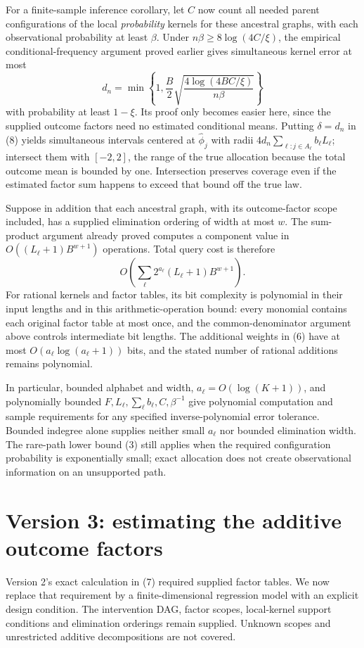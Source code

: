 \documentclass[11pt]{article}
\theoremstyle{definition}
\begin{document}
For a finite-sample inference corollary, let $C$ now count all needed
parent configurations of the local \emph{probability} kernels for these
ancestral graphs, with each observational probability at least $\beta$.
Under $n\beta\ge8\log(4C/\xi)$, the empirical conditional-frequency
argument proved earlier gives simultaneous kernel error at most
\[
 d_n=\min\left\{1,\frac B2
       \sqrt{\frac{4\log(4BC/\xi)}{n\beta}}\right\}
\]
with probability at least $1-\xi$. Its proof only becomes easier here,
since the supplied outcome factors need no estimated conditional means.
Putting $\delta=d_n$ in (8) yields simultaneous intervals centered at
$\widehat\phi_j$ with radii
$4d_n\sum_{\ell:j\in A_\ell}b_\ell L_\ell$; intersect them with
$[-2,2]$, the range of the true allocation because the total outcome
mean is bounded by one. Intersection preserves coverage even if the
estimated factor sum happens to exceed that bound off the true law.

Suppose in addition that each ancestral graph, with its outcome-factor
scope included, has a supplied elimination ordering of width at most
$w$. The sum-product argument already proved computes a component value
in $O((L_\ell+1)B^{w+1})$ operations. Total query cost is therefore
\[
 O\left(\sum_\ell2^{a_\ell}(L_\ell+1)B^{w+1}\right).
\]
For rational kernels and factor tables, its bit complexity is polynomial
in their input lengths and in this arithmetic-operation bound: every
monomial contains each original factor table at most once, and the
common-denominator argument above controls intermediate bit lengths.
The additional weights in (6) have at most $O(a_\ell\log(a_\ell+1))$
bits, and the stated number of rational additions remains polynomial.

In particular, bounded alphabet and width, $a_\ell=O(\log(K+1))$,
and polynomially bounded $F,L_\ell,\sum_\ell b_\ell,C,\beta^{-1}$
give polynomial computation and sample requirements for any specified
inverse-polynomial error tolerance. Bounded indegree alone supplies
neither small $a_\ell$ nor bounded elimination width. The rare-path
lower bound (3) still applies when the required configuration probability
is exponentially small; exact allocation does not create observational
information on an unsupported path.

\section*{Version 3: estimating the additive outcome factors}
Version 2's exact calculation in (7) required supplied factor tables.
We now replace that requirement by a finite-dimensional regression model
with an explicit design condition. The intervention DAG, factor scopes,
local-kernel support conditions and elimination orderings remain supplied.
Unknown scopes and unrestricted additive decompositions are not covered.
\end{document}
